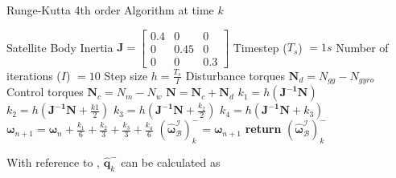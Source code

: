 \begin{algorithm}[!htb]
	\caption[Runge-Kutta]{Runge-Kutta 4th order Algorithm at time $k$}
	\label{alg: Runge-Kutta}
	\begin{algorithmic}[1]
		\State Satellite Body Inertia $\mathbf{J} = \begin{bmatrix}
			0.4 & 0 & 0\\
			0 & 0.45 & 0 \\
			0 & 0 & 0.3
		\end{bmatrix}$
		\State Timestep ($T_s$) $= 1s$
		\State Number of iterations ($I$) $= 10$
		\State Step size $h = \frac{T_s}{I}$
		\State Disturbance torques $\mathbf{N}_d = N_{gg} - N_{gyro} $ %
		\State Control torques $\mathbf{N}_c = N_m - N_w$
		\State $\mathbf{N} = \mathbf{N}_c + \mathbf{N}_d$
		\State \texttt{$k_1 = h(\mathbf{J^{-1}}\mathbf{N})$}
		\State \texttt{$k_2 = h(\mathbf{J^{-1}}\mathbf{N} + \frac{k1}{2})$}
		\State \texttt{$k_3 = h(\mathbf{J^{-1}}\mathbf{N} + \frac{k_2}{2})$}
		\State \texttt{$k_4 = h(\mathbf{J^{-1}}\mathbf{N} + k_3)$}
		\State \texttt{$\boldsymbol{\omega}_{n+1}=\boldsymbol{\omega}_n + \frac{k_1}{6} + \frac{k_2}{3} + \frac{k_3}{3} + \frac{k_4}{6}$}
		\EndFor
		\State $(\boldsymbol{\hat{\omega}}_{\mathcal{B}}^{\mathcal{I}})_k^- = \boldsymbol{\omega}_{n+1}$
		\State \textbf{return} $(\boldsymbol{\hat{\omega}}_{\mathcal{B}}^{\mathcal{I}})_k^-$
	\end{algorithmic}
\end{algorithm}
With reference to \cite{JansevanVuuren2015}, $\hat{\mathbf{q}}_k^-$ can be calculated as

